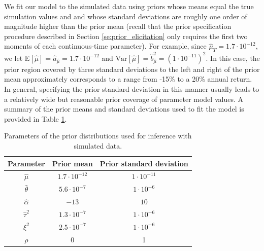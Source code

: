 \documentclass[10pt]{article}
\newcommand{\hb}{\hat{b}}
\newcommand{\ha}{\hat{a}}
\newcommand{\htheta}{\hat{\theta}}
\newcommand{\halpha}{\hat{\alpha}}
\newcommand{\hmu}{\hat{\mu}}
\newcommand{\htau}{\hat{\tau}}
\newcommand{\E}[1]{\mbox{E}\left[#1\right]}
\newcommand{\Var}[1]{\mbox{Var}\left[#1\right]}
\begin{document}
We fit our model to the simulated data using priors whose means equal
the true simulation values and and whose standard deviations are
roughly one order of magnitude higher than the prior mean (recall that
the prior specification procedure described in Section
\ref{se:prior_elicitation} only requires the first two moments of each
continuous-time parameter). For example, since
$\hmu_T = 1.7 \cdot 10^{-12}$, we let
$\E{\hmu} = \ha_{\hmu} = 1.7 \cdot 10^{-12}$ and
$\Var{\hmu} = \hb_{\hmu}^2 = (1 \cdot 10^{-11})^2$. In this case, the
prior region covered by three standard deviations to the left and
right of the prior mean approximately corresponds to a range from
-15\% to a 20\% annual return.  In general, specifying the prior
standard deviation in this manner usually leads to a relatively wide
but reasonable prior coverage of parameter model values. A summary of
the prior means and standard deviations used to fit the model is
provided in Table \ref{ta:priors}.
\begin{table}[h]
\begin{center}
\begin{tabular}{c|c|c}
  Parameter & Prior mean & Prior standard deviation \\ \hline
  $\hmu$ & $1.7 \cdot 10^{-12}$ & $1 \cdot 10^{-11}$  \\
  $\htheta$ & $5.6 \cdot 10^{-7}$ & $1 \cdot 10^{-6}$  \\
  $\halpha$ & $-13$ & $10$  \\
  $\htau^2$ & $1.3\cdot 10^{-7}$ & $1\cdot 10^{-6}$  \\
  $\xi^2$ & $2.5 \cdot 10^{-7}$ & $1\cdot 10^{-6}$ \\
  $\rho$ & 0 & 1
\end{tabular}
\caption{Parameters of the prior distributions used for inference with simulated data.}\label{ta:priors}
\end{center}
\end{table}


\end{document}
